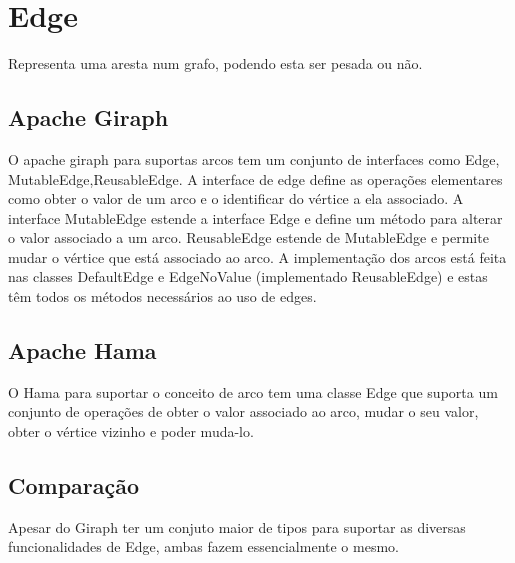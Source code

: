 \newpage
\section{Edge}
Representa uma aresta num grafo, podendo esta ser pesada ou não.
\subsection*{Apache Giraph}
O apache giraph para suportas arcos tem um conjunto de interfaces como Edge, MutableEdge,ReusableEdge. A interface de edge define as operações
elementares como obter o valor de um arco e o identificar do vértice a ela associado. A interface MutableEdge estende a interface Edge e define
um método para alterar o valor associado a um arco. ReusableEdge estende de MutableEdge e permite mudar o vértice que está associado ao arco.
A implementação dos arcos está feita nas classes DefaultEdge e EdgeNoValue (implementado ReusableEdge) e estas têm todos os métodos necessários ao uso de edges.

\subsection*{Apache Hama}
O Hama para suportar o conceito de arco tem uma classe Edge que suporta um conjunto de operações de obter o valor associado ao arco, mudar o seu valor,
obter o vértice vizinho e poder muda-lo. 

\subsection*{Comparação}
Apesar do Giraph ter um conjuto maior de tipos para suportar as diversas funcionalidades de Edge, ambas fazem essencialmente
o mesmo.